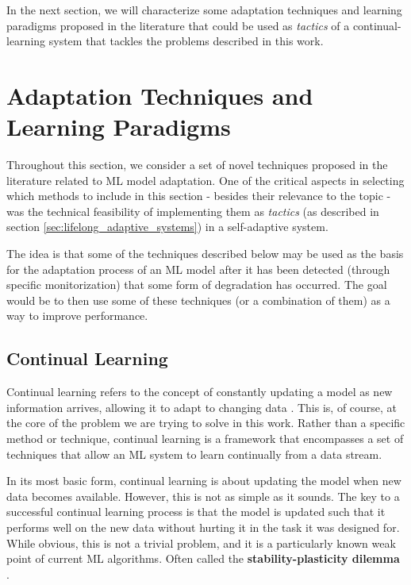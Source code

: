\documentclass[../main.tex]{subfiles}
\begin{document}
    In the next section, we will characterize some adaptation techniques and learning paradigms proposed in the literature that could be used as \textit{tactics} of a continual-learning system that tackles the problems described in this work.
    
    
    \section{Adaptation Techniques and Learning Paradigms} \label{sec:relevant_techniques} 

    Throughout this section, we consider a set of novel techniques proposed in the literature related to ML model adaptation. One of the critical aspects in selecting which methods to include in this section - besides their relevance to the topic - was the technical feasibility of implementing them as \textit{tactics} (as described in section \ref{sec:lifelong_adaptive_systems}) in a self-adaptive system. 

    The idea is that some of the techniques described below may be used as the basis for the adaptation process of an ML model after it has been detected (through specific monitorization) that some form of degradation has occurred. The goal would be to then use some of these techniques (or a combination of them) as a way to improve performance.

    \subsection{Continual Learning} \label{sec:continual_learning} 
	
    Continual learning refers to the concept of constantly updating a model as new information arrives, allowing it to adapt to changing data \cite{huyen_designing_2022}. This is, of course, at the core of the problem we are trying to solve in this work. Rather than a specific method or technique, continual learning is a framework that encompasses a set of techniques that allow an ML system to learn continually from a data stream.

    In its most basic form,  continual learning is about updating the model when new data becomes available. However, this is not as simple as it sounds. The key to a successful continual learning process is that the model is updated such that it performs well on the new data without hurting it in the task it was designed for. While obvious, this is not a trivial problem, and it is a particularly known weak point of current ML algorithms. Often called the \textbf{stability-plasticity dilemma} \cite{mermillodStabilityplasticityDilemmaInvestigating2013}.
\end{document}
